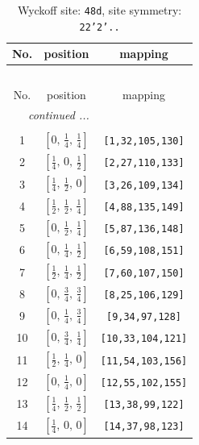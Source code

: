\documentclass[fleqn,8pt]{jsarticle}
\begin{document}
\begin{longtable}{ccc}
\caption{Wyckoff site: {\tt 48d}, site symmetry: {\tt 22'2'..}}
 \\
 \hline \hline
No. & position & mapping \\ \hline \endfirsthead

\multicolumn{2}{l}{\tablename\ \thetable{}} \\
 \hline \hline
No. & position & mapping \\ \hline \endhead

 \hline \hline
\multicolumn{2}{r}{\footnotesize\it continued ...} \\ \endfoot

 \hline \hline
\multicolumn{2}{r}{} \\ \endlastfoot

1 & $\left[ 0,\, \frac{1}{4},\, \frac{1}{4} \right]$ & {\tt [1,32,105,130]} \\ \hline
2 & $\left[ \frac{1}{4},\, 0,\, \frac{1}{2} \right]$ & {\tt [2,27,110,133]} \\ \hline
3 & $\left[ \frac{1}{4},\, \frac{1}{2},\, 0 \right]$ & {\tt [3,26,109,134]} \\ \hline
4 & $\left[ \frac{1}{2},\, \frac{1}{2},\, \frac{1}{4} \right]$ & {\tt [4,88,135,149]} \\ \hline
5 & $\left[ 0,\, \frac{1}{2},\, \frac{1}{4} \right]$ & {\tt [5,87,136,148]} \\ \hline
6 & $\left[ 0,\, \frac{1}{4},\, \frac{1}{2} \right]$ & {\tt [6,59,108,151]} \\ \hline
7 & $\left[ \frac{1}{2},\, \frac{1}{4},\, \frac{1}{2} \right]$ & {\tt [7,60,107,150]} \\ \hline
8 & $\left[ 0,\, \frac{3}{4},\, \frac{3}{4} \right]$ & {\tt [8,25,106,129]} \\ \hline
9 & $\left[ 0,\, \frac{1}{4},\, \frac{3}{4} \right]$ & {\tt [9,34,97,128]} \\ \hline
10 & $\left[ 0,\, \frac{3}{4},\, \frac{1}{4} \right]$ & {\tt [10,33,104,121]} \\ \hline
11 & $\left[ \frac{1}{2},\, \frac{1}{4},\, 0 \right]$ & {\tt [11,54,103,156]} \\ \hline
12 & $\left[ 0,\, \frac{1}{4},\, 0 \right]$ & {\tt [12,55,102,155]} \\ \hline
13 & $\left[ \frac{1}{4},\, \frac{1}{2},\, \frac{1}{2} \right]$ & {\tt [13,38,99,122]} \\ \hline
14 & $\left[ \frac{1}{4},\, 0,\, 0 \right]$ & {\tt [14,37,98,123]} \\ \hline

\end{longtable}
\end{document}
